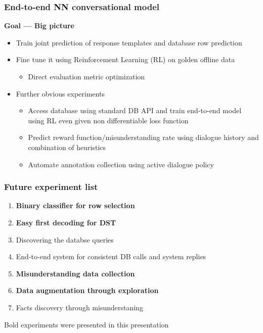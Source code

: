 \documentclass[10pt, compress,british,xcolor={svgnames,dvipsnames,x11names},trans]{beamer}
\begin{document}
\begin{frame}\frametitle{End-to-end NN conversational model}
    {\bf Goal --- Big picture}
    \begin{itemize}
        \item Train joint prediction of response templates and database row prediction 
        \item Fine tune it using Reinforcement Learning (RL) on golden offline data
            \begin{itemize}
                \item Direct evaluation metric optimization
            \end{itemize}
        \item Further obvious experiments
        \begin{itemize}
            \item Access database using standard DB API and train end-to-end model using RL even given non differentiable loss function
            \item Predict reward function/misunderstanding rate using dialogue history and combination of heuristics
            \item Automate annotation collection using active dialogue policy
        \end{itemize}
    \end{itemize}
\end{frame}

\begin{frame}\frametitle{Future experiment list}
    \begin{enumerate}
        \item {\bf Binary classifier for row selection}
        \item {\bf Easy first decoding for DST}
        \item Discovering the databse queries
        \item End-to-end system for consistent DB calls and system replies
        \item {\bf Misunderstanding data collection}
        \item {\bf Data augmentation through exploration}
        \item Facts discovery through misunderstaning
    \end{enumerate}
    {\footnotesize Bold experiments were presented in this presentation}
\end{frame}
\end{document}

